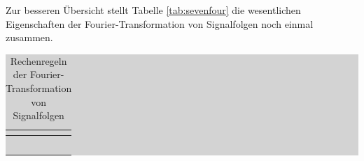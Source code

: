 \noindent Zur besseren \"{U}bersicht stellt Tabelle \ref{tab:sevenfour} die wesentlichen Eigenschaften der Fourier-Transformation von Signalfolgen noch einmal zusammen.
\clearpage
\begin{table}[H]
\setlength{\arrayrulewidth}{.1em}
\caption{Rechenregeln der Fourier-Transformation von Signalfolgen}
\setlength{\fboxsep}{0pt}%
\colorbox{lightgray}{%
%
\begin{tabular}{| c | c | c |}
\hline
\parbox[c][0.3in][c]{1.6in}{\smallskip\centering\textbf{\selectfont{Regel}}} & \parbox[c][0.3in][c]{1.8in}{\smallskip\centering\textbf{\selectfont{Funktion x(t)}}} &
\parbox[c][0.3in][c]{2.9in}{\smallskip\centering\textbf{\selectfont{Laplace-Transformierte X(s)}}}\\ \hline


\parbox[c][0.5in][c]{1.6in}{} & 
\parbox[c][0.5in][c]{1.8in}{} &
\parbox[c][0.5in][c]{2.9in}{}\\
\hline

\parbox[c][0.5in][c]{1.6in}{} & 
\parbox[c][0.5in][c]{1.8in}{} &
\parbox[c][0.5in][c]{2.9in}{}\\
\hline

\parbox[c][0.5in][c]{1.6in}{} & 
\parbox[c][0.5in][c]{1.8in}{} &
\parbox[c][0.5in][c]{2.9in}{}\\
\hline

\parbox[c][0.5in][c]{1.6in}{} & 
\parbox[c][0.5in][c]{1.8in}{} &
\parbox[c][0.5in][c]{2.9in}{}\\
\hline

\parbox[c][0.5in][c]{1.6in}{} & 
\parbox[c][0.5in][c]{1.8in}{} &
\parbox[c][0.5in][c]{2.9in}{}\\
\hline


\end{tabular}}
\end{table}
